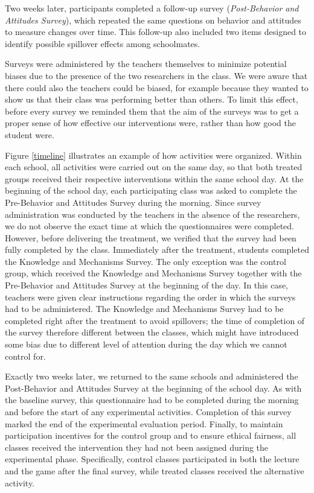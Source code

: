 \documentclass[preprint,12pt]{elsarticle}
\begin{document}
Two weeks later, participants completed a follow-up survey (\textit{Post-Behavior and Attitudes Survey}), which repeated the same questions on behavior and attitudes to measure changes over time. This follow-up also included two items designed to identify possible spillover effects among schoolmates.

Surveys were administered by the teachers themselves to minimize potential biases due to the presence of the two researchers in the class. We were aware that there could also the teachers could be biased, for example because they wanted to show us that their class was performing better than others. To limit this effect, before every survey we reminded them that the aim of the surveys was to get a proper sense of how effective our interventions were, rather than how good the student were.



Figure \ref{timeline} illustrates an example of how activities were organized. Within each school, all activities were carried out on the same day, so that both treated groups received their respective interventions within the same school day.
At the beginning of the school day, each participating class was asked to complete the Pre-Behavior and Attitudes Survey during the morning. Since survey administration was conducted by the teachers in the absence of the researchers, we do not observe the exact time at which the questionnaires were completed. However, before delivering the treatment, we verified that the survey had been fully completed by the class.
Immediately after the treatment, students completed the Knowledge and Mechanisms Survey. The only exception was the control group, which received the Knowledge and Mechanisms Survey together with the Pre-Behavior and Attitudes Survey at the beginning of the day. In this case, teachers were given clear instructions regarding the order in which the surveys had to be administered. The Knowledge and Mechanisms Survey had to be completed right after the treatment to avoid spillovers; the time of completion of the survey therefore different between the classes, which might have introduced some bias due to different level of attention during the day which we cannot control for.

Exactly two weeks later, we returned to the same schools and administered the Post-Behavior and Attitudes Survey at the beginning of the school day. As with the baseline survey, this questionnaire had to be completed during the morning and before the start of any experimental activities. Completion of this survey marked the end of the experimental evaluation period.
Finally, to maintain participation incentives for the control group and to ensure ethical fairness, all classes received the intervention they had not been assigned during the experimental phase. Specifically, control classes participated in both the lecture and the game after the final survey, while treated classes received the alternative activity.
\end{document}
